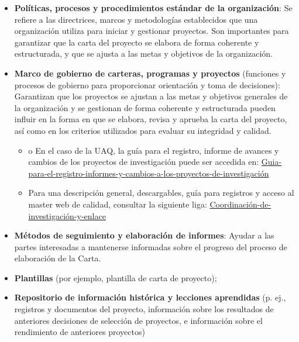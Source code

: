 \documentclass[letterpaper,12pt,openright,oneside]{article}
\theoremstyle{plain}
\begin{document}
\begin{itemize}
    \item \textbf{Políticas, procesos y procedimientos estándar de la organización}: Se refiere a las directrices, marcos y metodologías establecidos que una organización utiliza para iniciar y gestionar proyectos. Son importantes para garantizar que la carta del proyecto se elabora de forma coherente y estructurada, y que se ajusta a las metas y objetivos de la organización.
    \item \textbf{Marco de gobierno de carteras, programas y proyectos} (funciones y procesos de gobierno para proporcionar orientación y toma de decisiones): Garantizan que los proyectos se ajustan a las metas y objetivos generales de la organización y se gestionan de forma coherente y estructurada pueden influir en la forma en que se elabora, revisa y aprueba la carta del proyecto, así como en los criterios utilizados para evaluar su integridad y calidad.
        \begin{itemize}
            \item o	En el caso de la UAQ, la guía para el registro, informe de avances y cambios de los proyectos de investigación puede ser accedida en: \href{https://dip.uaq.mx/docs/investigacion/formatos/A-50-01-Guia-para-el-registro-informes-y-cambios-a-los-proyectos-de-investigacion_v1.2.pdf}{Guia-para-el-registro-informes-y-cambios-a-los-proyectos-de-investigación}
            \item Para una descripción general, descargables, guía para registros y acceso al master web de calidad, consultar la siguiente liga: \href{https://dip.uaq.mx/index.php/investigacion/coordinacion-de-investigacion-y-enlace}{Coordinación-de-investigación-y-enlace}
        \end{itemize}
    \item \textbf{Métodos de seguimiento y elaboración de informes}: Ayudar a las partes interesadas a mantenerse informadas sobre el progreso del proceso de elaboración de la Carta.
    \item \textbf{Plantillas} (por ejemplo, plantilla de carta de proyecto);
    \item \textbf{Repositorio de información histórica y lecciones aprendidas} (p. ej., registros y documentos del proyecto, información sobre los resultados de anteriores decisiones de selección de proyectos, e información sobre el rendimiento de anteriores proyectos)
\end{itemize}

%  
%  
\end{document}

